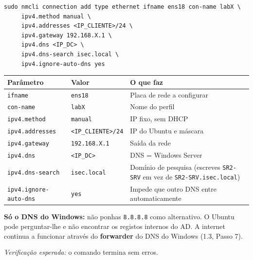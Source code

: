 \begin{lstlisting}[style=bashstyle]
sudo nmcli connection add type ethernet ifname ens18 con-name labX \
     ipv4.method manual \
     ipv4.addresses <IP_CLIENTE>/24 \
     ipv4.gateway 192.168.X.1 \
     ipv4.dns <IP_DC> \
     ipv4.dns-search isec.local \
     ipv4.ignore-auto-dns yes
\end{lstlisting}

\begin{center}\small
\begin{tabularx}{\linewidth}{|>{\raggedright\arraybackslash}X|>{\raggedright\arraybackslash}X|>{\raggedright\arraybackslash}X|}
\hline
\rowcolor{azul!10}\textbf{Parâmetro} & \textbf{Valor} & \textbf{O que faz} \\
\hline
\texttt{ifname} & \texttt{ens18} & Placa de rede a configurar \\
\hline
\texttt{con-name} & \texttt{labX} & Nome do perfil \\
\hline
\texttt{ipv4.method} & \texttt{manual} & IP fixo, sem DHCP \\
\hline
\texttt{ipv4.addresses} & \texttt{\textless{}IP\_CLIENTE\textgreater{}/\allowbreak{}24} & IP do Ubuntu e máscara \\
\hline
\texttt{ipv4.gateway} & \texttt{192.168.X.1} & Saída da rede \\
\hline
\texttt{ipv4.dns} & \texttt{\textless{}IP\_DC\textgreater{}} & DNS = Windows Server \\
\hline
\texttt{ipv4.dns-search} & \texttt{isec.local} & Domínio de pesquisa (escreves \texttt{SR2-SRV} em vez de \texttt{SR2-SRV.isec.local}) \\
\hline
\texttt{ipv4.ignore-auto-dns} & \texttt{yes} & Impede que outro DNS entre automaticamente \\
\hline
\end{tabularx}
\end{center}

\begin{importantebox}[title={Importante}]
\textbf{Só o DNS do Windows:} não ponhas \texttt{8.8.8.8} como alternativo. O Ubuntu pode perguntar-lhe e não encontrar os registos internos do AD. A internet continua a funcionar através do \textbf{forwarder} do DNS do Windows (1.3, Passo 7).
\end{importantebox}

\emph{Verificação esperada:} o comando termina sem erros.


